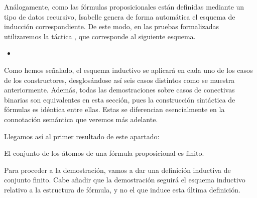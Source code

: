 \begin{isabellebody}
\begin{isamarkuptext}
  Análogamente, como las fórmulas proposicionales están definidas 
  mediante un tipo de datos recursivo, Isabelle genera de forma 
  automática el esquema de inducción correspondiente. De este modo, en 
  las pruebas formalizadas utilizaremos la táctica , 
  que corresponde al siguiente esquema.


  \begin{itemize}
    \item[] 
  \end{itemize} 

  Como hemos señalado, el esquema inductivo se aplicará en cada uno de 
  los casos de los constructores, desglosándose así seis casos distintos 
  como se muestra anteriormente. Además, todas las demostraciones sobre 
  casos de conectivas binarias son equivalentes en esta sección, pues la 
  construcción sintáctica de fórmulas es idéntica entre ellas. Estas se 
  diferencian esencialmente en la connotación semántica que veremos más 
  adelante.

  Llegamos así al primer resultado de este apartado:

  \begin{lema}
    El conjunto de los átomos de una fórmula proposicional es finito.
  \end{lema}

  Para proceder a la demostración, vamos a dar una definición inductiva 
  de conjunto finito. Cabe añadir que la demostración seguirá el esquema 
  inductivo relativo a la estructura de fórmula, y no el que induce esta
  última definición.


\end{isamarkuptext}
\end{isabellebody}
